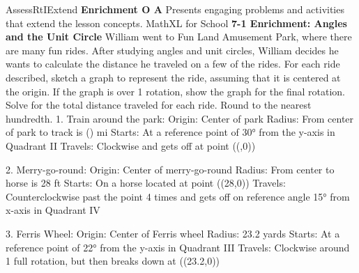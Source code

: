 \documentclass{article}
\newenvironment{te-addendum}[2]{}{}     %
\newcommand{\answer}[1]{}               %
\newcommand{\placeholder}[2]{}          %
\newcommand{\te}[1]{}                   %
\begin{document}
\begin{te-addendum}{Assess}{RtIExtend}
\textbf{Enrichment O A}
Presents engaging problems and activities that extend the lesson concepts.
MathXL for School
\textbf{7-1 Enrichment: Angles and the Unit Circle}
William went to Fun Land Amusement Park, where there are many fun rides. After studying angles and unit circles, William decides he wants to calculate the distance he traveled on a few of the rides.
For each ride described, sketch a graph to represent the ride, assuming that it is centered at the origin. If the graph is over 1 rotation, show the graph for the final rotation.
Solve for the total distance traveled for each ride. Round to the nearest hundredth.
1. Train around the park:
Origin: Center of park
Radius: From center of park to track is () mi
Starts: At a reference point of 30° from the y-axis in Quadrant II
Travels: Clockwise and gets off at point ((,0))
\answer{1. 0.52 mi}
\placeholder{graph}{Black arrowed x,y axes centered at O without ticks. Magenta rays positive x and into II30° left of positive y;30°magenta label.}
2. Merry-go-round:
Origin: Center of merry-go-round
Radius: From center to horse is 28 ft
Starts: On a horse located at point ((28,0))
Travels: Counterclockwise past the point 4 times and gets off on reference angle 15° from x-axis in Quadrant IV
\answer{2. 872.32 ft}
\placeholder{graph}{Black arrowed x,y axes centered at O without ticks. Magenta positive x ray and ray15° below positive x into IV, magenta15°label and counterclockwise nearly full arc.}
\te{Printed872.32 ft appears inconsistent with the stated four rotations; preserved.}
3. Ferris Wheel:
Origin: Center of Ferris wheel
Radius: 23.2 yards
Starts: At a reference point of 22° from the y-axis in Quadrant III
Travels: Clockwise around 1 full rotation, but then breaks down at ((23.2,0))
\answer{3. 246.19 yd}
\placeholder{graph}{Black arrowed x,y axes centered at O without ticks. Magenta positive x ray and ray in III22° left of negative y, magenta22°label; circle arc around origin.}
\end{te-addendum}
\end{document}
